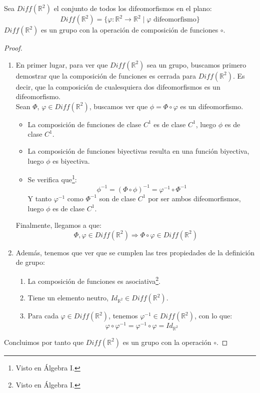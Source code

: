 \begin{prop}
    Sea $Diff(\mathbb{R}^2)$ el conjunto de todos los difeomorfismos en el plano:
\begin{equation*}
    Diff(\mathbb{R}^2) = \{\varphi:\mathbb{R}^2\rightarrow\mathbb{R}^2 \mid \varphi \text{\ difeomorfismo}\}
\end{equation*}
$Diff(\mathbb{R}^2)$ es un grupo con la operación de composición de funciones $\circ$.
\begin{proof}\ 
    \begin{enumerate}
        \item En primer lugar, para ver que $Diff(\mathbb{R}^2)$ sea un grupo, buscamos primero demostrar que la composición de funciones es cerrada para $Diff(\mathbb{R}^2)$. Es decir, que la composición de cualesquiera dos difeomorfismos es un difeomorfismo.\\

            Sean $\Phi$, $\varphi \in Diff(\mathbb{R}^2)$, buscamos ver que $\phi = \Phi \circ \varphi$ es un difeomorfismo.
\begin{itemize}
    \item La composición de funciones de clase $C^1$ es de clase $C^1$, luego $\phi$ es de clase $C^1$.
    \item La composición de funciones biyectivas resulta en una función biyectiva, luego $\phi$ es biyectiva.
    \item Se verifica que\footnote{Visto en Álgebra I.}:
        \begin{equation*}
            \phi^{-1} = {(\Phi \circ \phi)}^{-1} = \varphi^{-1} \circ \Phi^{-1}
        \end{equation*}
        Y tanto $\varphi^{-1}$ como $\Phi^{-1}$ son de clase $C^1$ por ser ambos difeomorfismos, luego $\phi$ es de clase $C^1$.
\end{itemize}
Finalmente, llegamos a que:
\begin{equation*}
    \Phi, \varphi \in Diff(\mathbb{R}^2) \Longrightarrow \Phi \circ \varphi \in Diff(\mathbb{R}^2)
\end{equation*}
    \item Además, tenemos que ver que se cumplen las tres propiedades de la definición de grupo:
        \begin{enumerate}[label=(\arabic*)]
        \item La composición de funciones es asociativa\footnote{Visto en Álgebra I.}.
        \item Tiene un elemento neutro, $Id_{\mathbb{R}^2}\in Diff(\mathbb{R}^2)$.
        \item Para cada $\varphi \in Diff(\mathbb{R}^2)$, tenemos $\varphi^{-1}\in Diff(\mathbb{R}^2)$, con lo que:
            \begin{equation*}
                \varphi \circ \varphi^{-1} = \varphi^{-1} \circ \varphi = Id_{\mathbb{R}^2}
            \end{equation*}
        \end{enumerate}
\end{enumerate}
Concluimos por tanto que $Diff(\mathbb{R}^2)$ es un grupo con la operación $\circ$.
\end{proof}
\end{prop}
